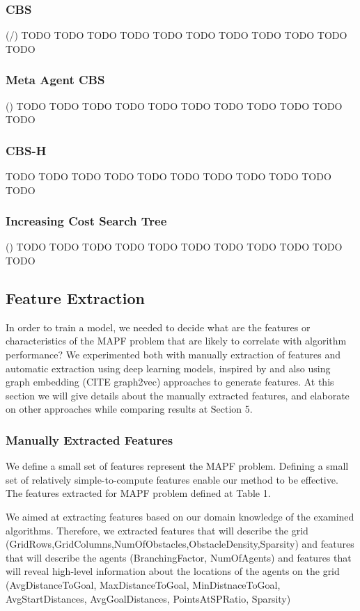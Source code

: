 \documentclass[letterpaper]{article} %
\begin{document}
\subsubsection{ CBS } 
(\cite{sharon2015conflict}/)
TODO TODO TODO TODO TODO TODO TODO TODO TODO TODO TODO 
\subsubsection{ Meta Agent CBS }
(\cite{sharon2012meta})
TODO TODO TODO TODO TODO TODO TODO TODO TODO TODO TODO 
\subsubsection{ CBS-H }
TODO TODO TODO TODO TODO TODO TODO TODO TODO TODO TODO 
\subsubsection{ Increasing Cost Search Tree } (\cite{sharon2013increasing})
TODO TODO TODO TODO TODO TODO TODO TODO TODO TODO TODO 


\subsection{Feature Extraction}
In order to train a model, we needed to decide what are the features or
characteristics of the MAPF problem that are likely to correlate with algorithm performance? We experimented both with manually extraction of features and automatic extraction using deep learning models, inspired by \cite{sigurdson2019deep} and also using graph embedding (CITE graph2vec) approaches to generate features. At this section we will give details about the manually extracted features, and elaborate on other approaches while comparing results at Section 5.

\subsubsection{Manually Extracted Features} We define a small set of features represent the MAPF problem. Defining a small set of relatively simple-to-compute features enable our method to be effective. The features extracted for MAPF problem defined at Table 1.

We aimed at extracting features based on our domain knowledge of the examined algorithms. Therefore, we extracted features that will describe the grid (GridRows,GridColumns,NumOfObstacles,ObstacleDensity,Sparsity) and features that will describe the agents (BranchingFactor, NumOfAgents) and features that will reveal high-level information about the locations of the agents on the grid (AvgDistanceToGoal, MaxDistanceToGoal, MinDistnaceToGoal, AvgStartDistances, AvgGoalDistances, PointsAtSPRatio, Sparsity)
\end{document}
